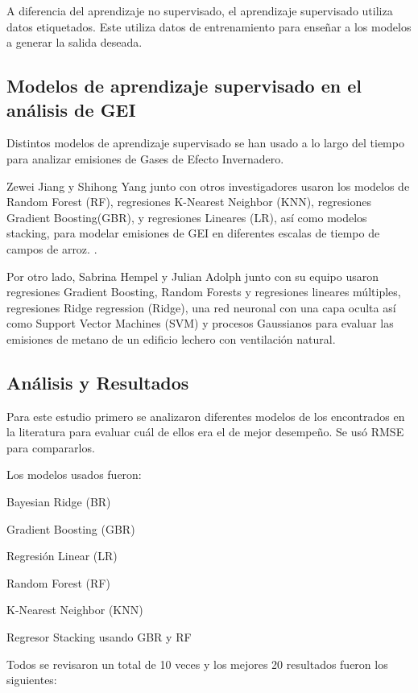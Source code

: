 \documentclass[13.6pt]{article}
\let\tempone\itemize
\let\temptwo\enditemize
\renewenvironment{itemize}{\tempone\setlength{\itemsep}{0pt}}{\temptwo}
\begin{document}
A diferencia del aprendizaje no supervisado, el aprendizaje supervisado utiliza datos etiquetados. Este utiliza datos de entrenamiento para enseñar a los modelos a generar la salida deseada.

\subsection{Modelos de aprendizaje supervisado en el análisis de GEI}

Distintos modelos de aprendizaje supervisado se han usado a lo largo del tiempo para analizar emisiones de Gases de Efecto Invernadero.

Zewei Jiang y Shihong Yang junto con otros investigadores usaron los modelos de Random Forest (RF), regresiones K-Nearest Neighbor (KNN), regresiones Gradient Boosting(GBR), y regresiones Lineares (LR), así como modelos stacking, para modelar emisiones de GEI en diferentes escalas de tiempo de campos de arroz. \citep{JIANG2023108821} .

Por otro lado, Sabrina Hempel y Julian Adolph junto con su equipo usaron regresiones Gradient Boosting, Random Forests y regresiones lineares múltiples, regresiones Ridge regression (Ridge), una red neuronal con una capa oculta así como Support Vector Machines (SVM) y procesos Gaussianos para evaluar las emisiones de metano de un edificio lechero con ventilación natural. \citep{app10196938}


\subsection{Análisis y Resultados}

Para este estudio primero se analizaron diferentes modelos de los encontrados en la literatura para evaluar cuál de ellos era el de mejor desempeño. Se usó RMSE para compararlos.

Los modelos usados fueron:

\begin{itemize}
\item Bayesian Ridge (BR)
\item Gradient Boosting (GBR)
\item Regresión Linear (LR)
\item Random Forest (RF)
\item K-Nearest Neighbor (KNN)
\item Regresor Stacking usando GBR y RF
\end{itemize}


Todos se revisaron un total de 10 veces y los mejores 20 resultados fueron los siguientes:
\end{document}
